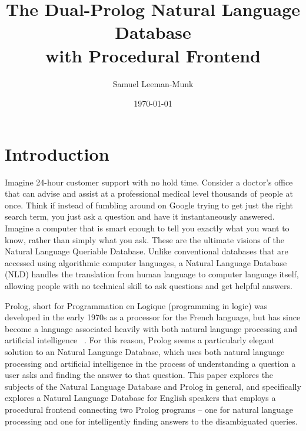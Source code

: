 \documentclass[12pt]{article}
\begin{document}
\author{Samuel Leeman-Munk}
\date{\today}
\title{The Dual-Prolog Natural Language Database \\ with Procedural Frontend}
\maketitle
{}
\clearpage
\section*{Introduction}
Imagine 24-hour customer support with no hold time. Consider a doctor's office that can advise and assist at a professional medical level thousands of people at once. Think if instead of fumbling around on Google trying to get just the right search term, you just ask a question and have it instantaneously answered. Imagine a computer that is smart enough to tell you exactly what you want to know, rather than simply what you ask. These are the ultimate visions of the Natural Language Queriable Database. Unlike conventional databases that are accessed using algorithmic computer languages, a Natural Language Database (NLD) handles the translation from human language to computer language itself, allowing people with no technical skill to ask questions and get helpful answers.

Prolog, short for Programmation en Logique (programming in logic) was developed in the early 1970s as a processor for the French language, but has since become a language associated heavily with both natural language processing and artificial intelligence ~\citep{birthofprolog}. For this reason, Prolog seems a particularly elegant solution to an Natural Language Database, which uses both natural language processing and artificial intelligence in the process of understanding a question a user asks and finding the answer to that question. This paper explores the subjects of the Natural Language Database and Prolog in general, and specifically explores a Natural Language Database for English speakers that employs a procedural frontend connecting two Prolog programs -- one for natural language processing and one for intelligently finding answers to the disambiguated queries.
\end{document}
